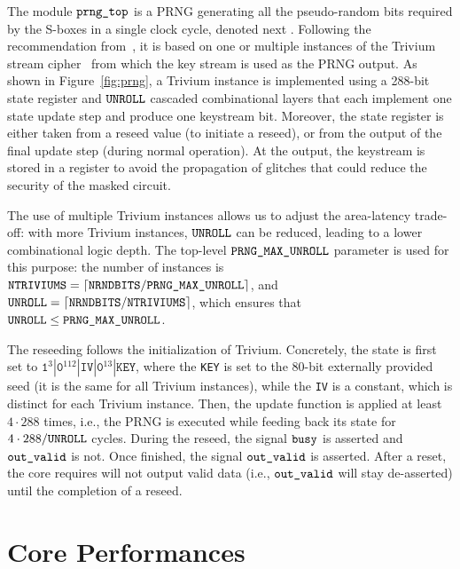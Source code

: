 \documentclass{scrartcl}
\begin{document}
\label{subsection:PRNG}

The module $\texttt{prng\_top}$ is a PRNG generating all the pseudo-random bits
required by the S-boxes in a single clock cycle, denoted next \NRNDBITS.
Following the recommendation from~\cite{CiC-1-2-4}, it is based on one or
multiple instances of the Trivium stream
cipher~\cite{DBLP:series/lncs/CanniereP08} from which the key stream is used as
the PRNG output. As shown in Figure~\ref{fig:prng}, a Trivium instance is
implemented using a 288-bit state register and $\texttt{UNROLL}$ cascaded combinational
layers that each implement one state update step and produce one keystream bit.
Moreover, the state register is either taken from a reseed value (to initiate a
reseed), or from the output of the final update step (during normal operation).
At the output, the keystream is stored in a register to avoid the propagation
of glitches that could reduce the security of the masked circuit.

The use of multiple Trivium instances allows us to adjust the area-latency
trade-off: with more Trivium instances, $\texttt{UNROLL}$ can be reduced, leading to a
lower combinational logic depth.  The top-level $\texttt{PRNG\_MAX\_UNROLL}$ parameter is used
for this purpose: the number of instances is $\texttt{NTRIVIUMS} = \lceil \texttt{NRNDBITS} /
\texttt{PRNG\_MAX\_UNROLL} \rceil$, and $\texttt{UNROLL} = \lceil \texttt{NRNDBITS} / \texttt{NTRIVIUMS} \rceil$, which
ensures that $\texttt{UNROLL} \le \texttt{PRNG\_MAX\_UNROLL}$.

The reseeding follows the initialization of Trivium. Concretely, the state is
first set to
$\texttt{1}^3|\texttt{0}^{112}|\texttt{IV}|\texttt{0}^{13}|\texttt{KEY}$, where
the \texttt{KEY} is set to the 80-bit externally provided seed (it is
the same for all Trivium instances), while the \texttt{IV} is a constant, which
is distinct for each Trivium instance.  Then, the update function is applied at
least $4\cdot 288$ times, i.e., the PRNG is executed while feeding back its
state for $4\cdot 288 / \texttt{UNROLL}$ cycles.  During the reseed, the signal
$\texttt{busy}$ is asserted and $\texttt{out\_valid}$ is not. Once finished, the
signal $\texttt{out\_valid}$ is asserted.  After a reset, the core requires will
not output valid data (i.e., $\texttt{out\_valid}$ will stay de-asserted) until
the completion of a reseed.
  
\section{Core Performances}
\end{document}
